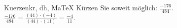 \begin{MAufgabe}{Kuerzen}{kr, dh, MaTeX}
K\"urzen Sie soweit m\"oglich: $\frac{-176}{484}$.\\ 
\ifLsg\MLoesung
\quad $\frac{-176}{484}=\frac{(44)\cdot(-4)}{(44)\cdot(11)}=\frac{-4}{11}$.\else\relax\fi
 \end{MAufgabe}
